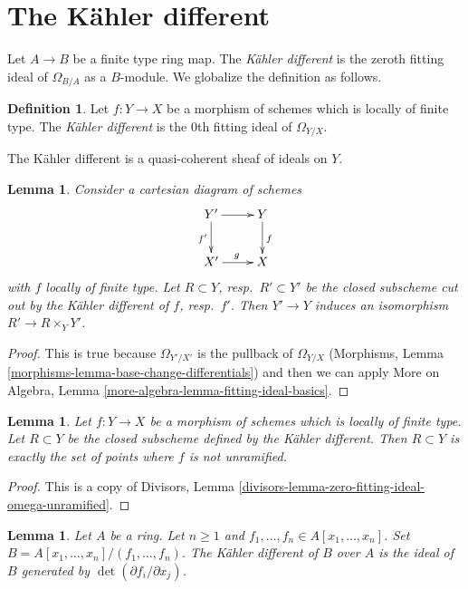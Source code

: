 \documentclass{stacks-project}
\theoremstyle{plain}
\newtheorem{lemma}[subsection]{Lemma}
\theoremstyle{definition}
\newtheorem{definition}[subsection]{Definition}
\theoremstyle{remark}
\numberwithin{equation}{subsection}
\begin{document}
\section{The K\"ahler different}
\label{section-kahler-different}

\noindent
Let $A \to B$ be a finite type ring map. The {\it K\"ahler different} is the
zeroth fitting ideal of $\Omega_{B/A}$ as a $B$-module. We globalize the
definition as follows.

\begin{definition}
\label{definition-kahler-different}
Let $f : Y \to X$ be a morphism of schemes which is locally of finite type.
The {\it K\"ahler different} is the $0$th fitting ideal of $\Omega_{Y/X}$.
\end{definition}

\noindent
The K\"ahler different is a quasi-coherent sheaf of ideals on $Y$.

\begin{lemma}
\label{lemma-base-change-kahler-different}
Consider a cartesian diagram of schemes
$$
\xymatrix{
Y' \ar[d]_{f'} \ar[r] & Y \ar[d]^f \\
X' \ar[r]^g & X
}
$$
with $f$ locally of finite type. Let $R \subset Y$, resp.\ $R' \subset Y'$
be the closed subscheme cut out by the K\"ahler different of $f$, resp.\ $f'$.
Then $Y' \to Y$ induces an isomorphism $R' \to R \times_Y Y'$.
\end{lemma}

\begin{proof}
This is true because $\Omega_{Y'/X'}$ is the pullback of $\Omega_{Y/X}$
(Morphisms, Lemma \ref{morphisms-lemma-base-change-differentials})
and then we can apply
More on Algebra, Lemma \ref{more-algebra-lemma-fitting-ideal-basics}.
\end{proof}

\begin{lemma}
\label{lemma-kahler-different}
Let $f : Y \to X$ be a morphism of schemes which is locally of finite type.
Let $R \subset Y$ be the closed subscheme defined by
the K\"ahler different. Then $R \subset Y$ is exactly
the set of points where $f$ is not unramified.
\end{lemma}

\begin{proof}
This is a copy of
Divisors, Lemma \ref{divisors-lemma-zero-fitting-ideal-omega-unramified}.
\end{proof}

\begin{lemma}
\label{lemma-kahler-different-complete-intersection}
Let $A$ be a ring. Let $n \geq 1$ and
$f_1, \ldots, f_n \in A[x_1, \ldots, x_n]$.
Set $B = A[x_1, \ldots, x_n]/(f_1, \ldots, f_n)$.
The K\"ahler different of $B$ over $A$ is the ideal
of $B$ generated by $\det(\partial f_i/\partial x_j)$.
\end{lemma}
\end{document}
